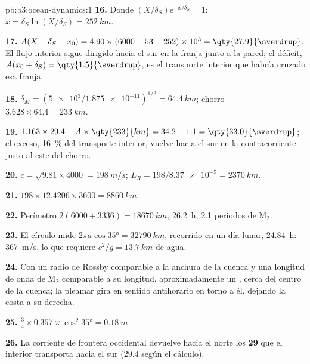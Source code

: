 \begin{solution}{pb:b3:ocean-dynamics:1}
\textbf{16.} Donde $(X/\delta_S)\mathrm e^{-x/\delta_S} = 1$: $x =
\delta_S\ln(X/\delta_S) = \qty{252}{km}$.

\textbf{17.} $A(X - \delta_S - x_0) = 4.90\times(6000 - 53 - 252)\times
10^3 = \qty{27.9}{\sverdrup}$. El flujo interior sigue dirigido hacia el sur en
la franja junto a la pared; el déficit, $A(x_0 + \delta_S) =
\qty{1.5}{\sverdrup}$, es el transporte interior que habría cruzado
esa franja.

\textbf{18.} $\delta_M = (\num{5e3}/\num{1.875e-11})^{1/3} = \qty{64.4}{km}$;
chorro $3.628\times64.4 = \qty{233}{km}$.

\textbf{19.} $1.163\times29.4 - A\times\qty{233}{km} = 34.2 - 1.1 =
\qty{33.0}{\sverdrup}$; el exceso, \qty{16}{\percent} del transporte
interior, vuelve hacia el sur en la contracorriente justo al este del chorro.

\textbf{20.} $c = \sqrt{9.81\times4000} = \qty{198}{m/s}$; $L_R =
198/\num{8.37e-5} = \qty{2370}{km}$.

\textbf{21.} $198\times12.4206\times3600 = \qty{8860}{km}$.

\textbf{22.} Perímetro $2(6000 + 3336) = \qty{18670}{km}$, \qty{26.2}{h},
2.1 periodos de M$_2$.

\textbf{23.} El círculo mide $2\pi a\cos\ang{35} = \qty{32790}{km}$, recorrido
en un día lunar, \qty{24.84}{h}: \qty{367}{m/s}, lo que requiere $c^2/g =
\qty{13.7}{km}$ de agua.

\textbf{24.} Con un radio de Rossby comparable a la anchura de la cuenca
y una longitud de onda de M$_2$ comparable a su longitud, aproximadamente un , cerca del centro de la cuenca; la pleamar gira en sentido antihorario
en torno a él, dejando la costa a su derecha.

\textbf{25.} $\tfrac34\times0.357\times\cos^2\ang{35} = \qty{0.18}{m}$.

\textbf{26.} La corriente de frontera occidental devuelve hacia el norte los
\textbf{\qty[text-series-to-math=true]{29}{\sverdrup}} que el interior
transporta hacia el sur (\qty{29.4}{\sverdrup} según el cálculo).
\end{solution}
